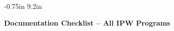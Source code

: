  
\setlength{\topmargin} {-0.75in}
\setlength{\textheight} {9.2in}
 
%
\newcommand{\marginsize}[1]{%
  \setlength{\oddsidemargin}{#1}
  \setlength{\textwidth}{8.5in}                %
  \addtolength{\textwidth}{-2\oddsidemargin}   %
  \setlength{\marginparwidth}{.75\oddsidemargin}%
  \setlength{\marginparsep}{.1\oddsidemargin}  %
  \addtolength{\oddsidemargin}{-1in}           %
  \setlength{\evensidemargin}{\oddsidemargin}  %
}
\marginsize{1.0in}
\pagestyle{empty}



\begin{center}
\Large\bf      Documentation Checklist -- All IPW Programs
\vspace{.3in}
\end{center}
 

